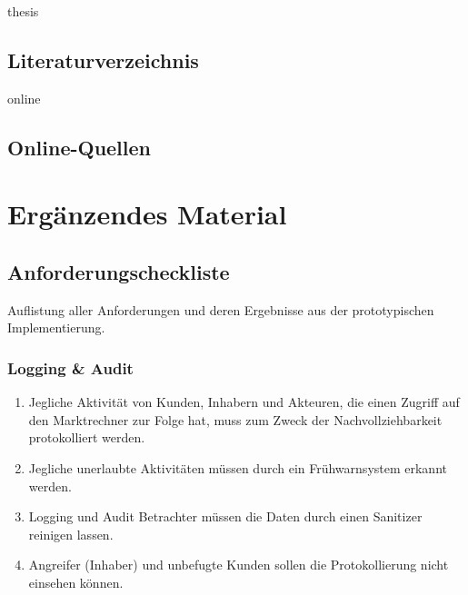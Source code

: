 \documentclass[11pt,a4paper]{report}
\begin{document}
\newpage


\begin{btSect}{thesis} %
\section*{Literaturverzeichnis}
\btPrintCited
\end{btSect}
\begin{btSect}{online}
\section*{Online-Quellen}
\btPrintCited
\end{btSect}

\appendix

\chapter{Ergänzendes Material}

\section{Anforderungscheckliste}

Auflistung aller Anforderungen und deren Ergebnisse aus der prototypischen Implementierung.

\subsection{Logging \& Audit}

\begin{enumerate}
\item[\Square] Jegliche Aktivität von Kunden, Inhabern und Akteuren, die einen Zugriff auf den Marktrechner zur Folge hat, muss zum Zweck der Nachvollziehbarkeit protokolliert werden.
\item[\Square] Jegliche unerlaubte Aktivitäten müssen durch ein Frühwarnsystem erkannt werden. 
\item[\Square] Logging und Audit Betrachter müssen die Daten durch einen Sanitizer reinigen lassen. 
\item[\Square] Angreifer (Inhaber) und unbefugte Kunden sollen die Protokollierung nicht einsehen können.
\end{enumerate}
\end{document}
